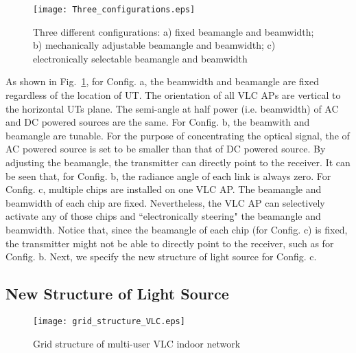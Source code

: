 \documentclass[10pt,journal]{IEEEtran}
\begin{document}
\begin{figure}
\centering
\texttt{[image: Three\_configurations.eps]}
\caption{Three different configurations: a) fixed beamangle and beamwidth; b) mechanically adjustable beamangle and beamwidth; c) electronically selectable beamangle and beamwidth}
\vspace{-5pt}
\label{fig_three_configurations}
\end{figure}

As shown in Fig.~\ref{fig_three_configurations}, for Config. a, the beamwidth and beamangle are fixed regardless of the location of UT. The orientation of all VLC APs are vertical to the horizontal UTs plane. The semi-angle at half power  (i.e. beamwidth) of AC and DC powered sources are the same. For Config. b, the beamwith and beamangle are tunable. For the purpose of concentrating the optical signal, the  of AC powered source is set to be smaller than that of DC powered source. By adjusting the beamangle, the transmitter can directly point to the receiver. It can be seen that, for Config. b, the radiance angle of each link is always zero. For Config. c, multiple chips are installed on one VLC AP. The beamangle and beamwidth of each chip are fixed. Nevertheless, the VLC AP can selectively activate any of those chips and ``electronically steering" the beamangle and beamwidth. Notice that, since the beamangle of each chip (for Config. c) is fixed, the transmitter might not be able to directly point to the receiver, such as for Config. b. Next, we specify the new structure of light source for Config. c.

\subsection{New Structure of Light Source}

\begin{wrapfigure}{r}{0.21\textwidth}
  \vspace{-5pt}
  \begin{center}
    \texttt{[image: grid\_structure\_VLC.eps]}
  \end{center}
  \vspace{-10pt}
  \caption{Grid structure of multi-user VLC indoor network}
  \vspace{-5pt}
  \label{fig_grid_structure_VLC}
\end{wrapfigure}
\end{document}
